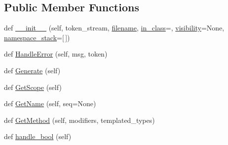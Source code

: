 \subsection*{Public Member Functions}
\begin{DoxyCompactItemize}
\item 
def \mbox{\hyperlink{classgoogletest-master_1_1googlemock_1_1scripts_1_1generator_1_1cpp_1_1ast_1_1_ast_builder_a8e609bc066a21f0f3fd67302cd22cf82}{\+\_\+\+\_\+init\+\_\+\+\_\+}} (self, token\+\_\+stream, \mbox{\hyperlink{classgoogletest-master_1_1googlemock_1_1scripts_1_1generator_1_1cpp_1_1ast_1_1_ast_builder_ab44464a47286618c03616709a0b79c14}{filename}}, \mbox{\hyperlink{classgoogletest-master_1_1googlemock_1_1scripts_1_1generator_1_1cpp_1_1ast_1_1_ast_builder_adaa5989e871032ed52f9d68840151e1e}{in\+\_\+class}}=\textquotesingle{}\textquotesingle{}, \mbox{\hyperlink{classgoogletest-master_1_1googlemock_1_1scripts_1_1generator_1_1cpp_1_1ast_1_1_ast_builder_a3b68dfb883315893942ac5deba813723}{visibility}}=None, \mbox{\hyperlink{classgoogletest-master_1_1googlemock_1_1scripts_1_1generator_1_1cpp_1_1ast_1_1_ast_builder_a019f8c8da814caf6e711ce499653dc20}{namespace\+\_\+stack}}=\mbox{[}$\,$\mbox{]})
\item 
def \mbox{\hyperlink{classgoogletest-master_1_1googlemock_1_1scripts_1_1generator_1_1cpp_1_1ast_1_1_ast_builder_ae9bc03685af192ec09d6be2833adc4e8}{Handle\+Error}} (self, msg, token)
\item 
def \mbox{\hyperlink{classgoogletest-master_1_1googlemock_1_1scripts_1_1generator_1_1cpp_1_1ast_1_1_ast_builder_a8687a7291f28c82970d3c2f723e09e63}{Generate}} (self)
\item 
def \mbox{\hyperlink{classgoogletest-master_1_1googlemock_1_1scripts_1_1generator_1_1cpp_1_1ast_1_1_ast_builder_a729deb67c6880aeb645dc19ec2ba7c5d}{Get\+Scope}} (self)
\item 
def \mbox{\hyperlink{classgoogletest-master_1_1googlemock_1_1scripts_1_1generator_1_1cpp_1_1ast_1_1_ast_builder_a2348717a6d592e9c666a8be72803b85f}{Get\+Name}} (self, seq=None)
\item 
def \mbox{\hyperlink{classgoogletest-master_1_1googlemock_1_1scripts_1_1generator_1_1cpp_1_1ast_1_1_ast_builder_a0313e1633b85633ec0aa91234c17c60a}{Get\+Method}} (self, modifiers, templated\+\_\+types)
\item 
def \mbox{\hyperlink{classgoogletest-master_1_1googlemock_1_1scripts_1_1generator_1_1cpp_1_1ast_1_1_ast_builder_a796d8a5d7ec050f5dc3bacaab44627c8}{handle\+\_\+bool}} (self)
\item 

\end{DoxyCompactItemize}
